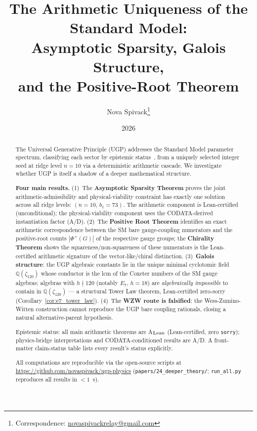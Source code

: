 \documentclass[11pt]{article}
\title{\bfseries The Arithmetic Uniqueness of the Standard Model: \\[0.3em]
Asymptotic Sparsity, Galois Structure, \\[0.2em]
and the Positive-Root Theorem}
\author[1]{Nova Spivack\thanks{Correspondence:
  \href{mailto:novaspivackrelay@gmail.com}{novaspivackrelay@gmail.com}}}
\affil[1]{Independent Research}
\date{2026}
\theoremstyle{remark}
\begin{document}
\maketitle
\NovaZenodoAfterTitle

\begin{abstract}
The Universal Generative Principle (UGP) addresses the Standard Model parameter spectrum,
classifying each sector by epistemic status~\cite{Spivack2026_SM_UGP},
from a uniquely selected integer seed at ridge level $n{=}10$ via a deterministic
arithmetic cascade.
We investigate whether UGP is itself a shadow of a deeper mathematical structure.

\textbf{Four main results.}
(1)~The \textbf{Asymptotic Sparsity Theorem} proves the joint arithmetic-admissibility and physical-viability constraint has exactly one solution across all ridge levels: $(n{=}10,\,b_1{=}73)$.  The arithmetic component is Lean-certified (unconditional); the physical-viability component uses the CODATA-derived instantiation factor (A/D).
(2)~The \textbf{Positive Root Theorem} identifies an exact arithmetic correspondence between the SM bare gauge-coupling numerators and the positive-root counts $|\Phi^+(G)|$ of the respective gauge groups; the \textbf{Chirality Theorem} shows the squareness/non-squareness of these numerators is the Lean-certified arithmetic signature of the vector-like/chiral distinction.
(3)~\textbf{Galois structure}: the UGP algebraic constants lie in the unique minimal cyclotomic field $\mathbb{Q}(\zeta_{120})$ whose conductor is the lcm of the Coxeter numbers of the SM gauge algebras; algebras with $h \nmid 120$ (notably $E_7$, $h=18$) are \emph{algebraically impossible} to contain in $\mathbb{Q}(\zeta_{120})$ — a structural Tower Law theorem, Lean-certified zero-sorry (Corollary~\ref{cor:e7_tower_law}).
(4)~The \textbf{WZW route is falsified}: the Wess-Zumino-Witten construction cannot reproduce the UGP bare coupling rationals, closing a natural alternative-parent hypothesis.

Epistemic status: all main arithmetic theorems are A$_{\rm Lean}$ (Lean-certified, zero \texttt{sorry}); physics-bridge interpretations and CODATA-conditioned results are A/D.  A front-matter claim-status table lists every result's status explicitly.

All computations are reproducible via the open-source scripts at
\url{https://github.com/novaspivack/ugp-physics} (\texttt{papers/24\_deeper\_theory/};
\texttt{run\_all.py} reproduces all results in $<1$~s).
\end{abstract}
\end{document}

